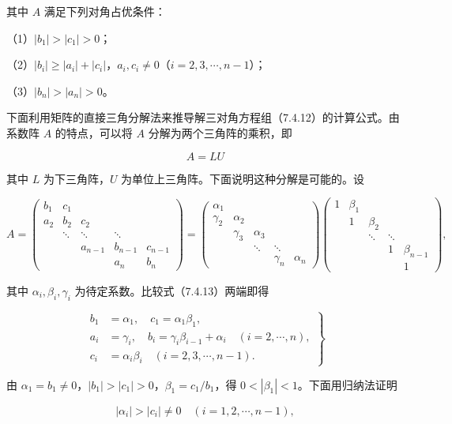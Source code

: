 \documentclass[
  10pt,
  fontset=fandol]{ctexart}
\begin{document}
其中 \(A\) 满足下列对角占优条件：

（1）\(|b_1|>|c_1|>0\)；

（2）\(|b_i|\geqslant|a_i|+|c_i|\)，\(a_i,c_i\neq0\)（\(i=2,3,\cdots,n-1\)）；

（3）\(|b_n|>|a_n|>0\)。

下面利用矩阵的直接三角分解法来推导解三对角方程组（7.4.12）的计算公式。由系数阵 \(A\) 的特点，可以将 \(A\) 分解为两个三角阵的乘积，即

\[
A=LU
\]

其中 \(L\) 为下三角阵，\(U\) 为单位上三角阵。下面说明这种分解是可能的。设

\[
A=\begin{pmatrix}
b_1&c_1&&&\\
a_2&b_2&c_2&&\\
&\ddots&\ddots&\ddots&\\
&&a_{n-1}&b_{n-1}&c_{n-1}\\
&&&a_n&b_n
\end{pmatrix}
=\begin{pmatrix}
\alpha_1&&&&\\
\gamma_2&\alpha_2&&&\\
&\gamma_3&\alpha_3&&\\
&&\ddots&\ddots&\\
&&&\gamma_n&\alpha_n
\end{pmatrix}
\begin{pmatrix}
1&\beta_1&&&\\
&1&\beta_2&&\\
&&\ddots&\ddots&\\
&&&1&\beta_{n-1}\\
&&&&1
\end{pmatrix},
\tag{7.4.13}
\]

其中 \(\alpha_i,\beta_i,\gamma_i\) 为待定系数。比较式（7.4.13）两端即得

\[
\left.\begin{aligned}
b_1&=\alpha_1,\quad c_1=\alpha_1\beta_1,\\
a_i&=\gamma_i,\quad b_i=\gamma_i\beta_{i-1}+\alpha_i\quad(i=2,\cdots,n),\\
c_i&=\alpha_i\beta_i\quad(i=2,3,\cdots,n-1).
\end{aligned}\right\}
\tag{7.4.14}
\]

由 \(\alpha_1=b_1\neq0\)，\(|b_1|>|c_1|>0\)，\(\beta_1=c_1/b_1\)，得 \(0<|\beta_1|<1\)。下面用归纳法证明

\[
|\alpha_i|>|c_i|\neq0\quad(i=1,2,\cdots,n-1),
\tag{7.4.15}
\]
\end{document}
